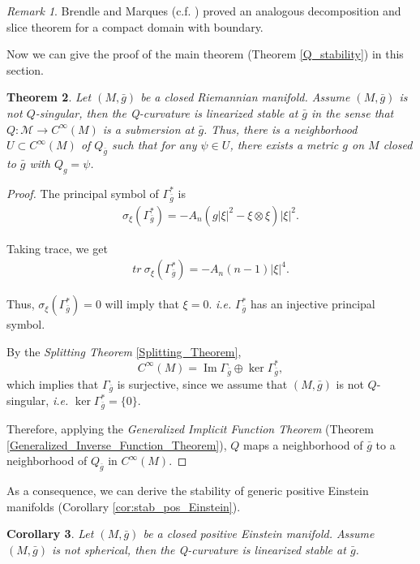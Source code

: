 \documentclass[12pt]{amsart}
\newtheorem{theorem}{Theorem}[section]
\newtheorem{corollary}[theorem]{Corollary}
\theoremstyle{definition}
\theoremstyle{remark}
\newtheorem{remark}[theorem]{Remark}
\numberwithin{equation}{section}
\begin{document}
\begin{remark}
Brendle and Marques (c.f. \cite{B-M}) proved an analogous decomposition and slice theorem for a compact domain with boundary.
\end{remark}

Now we can give the proof of the main theorem (Theorem \ref{Q_stability}) in this section.
\begin{theorem}
Let $(M,\bar{g})$ be a closed Riemannian manifold. Assume
$(M,\bar{g})$ is not $Q$-singular, then the Q-curvature is linearized stable at $\bar g$ in the sense that $Q : \mathcal{M} \rightarrow C^{\infty}(M) $ is a submersion at $\bar{g}$.
Thus, there is a neighborhood $U \subset C^{\infty}(M)$ of $Q_{\bar{g}}$ such that for any $\psi \in U$, there exists a metric $g$ on $M$ closed to $\bar{g}$ with $Q_g = \psi$.
\end{theorem}
\begin{proof}

The principal symbol of $\Gamma_{\bar{g}}^*$ is
\begin{align*}
\sigma_{\xi}(\Gamma_{\bar{g}}^*) = - A_n \left( g |\xi|^2 - \xi \otimes\xi \right)|\xi|^2.
\end{align*}

Taking trace, we get
\begin{align*}
tr\ \sigma_{\xi}(\Gamma_{\bar{g}}^*) = - A_n \left( n - 1 \right)|\xi|^4.
\end{align*}

Thus, $\sigma_{\xi}(\Gamma_{\bar{g}}^*) = 0$ will imply that $\xi = 0$. \emph{i.e.} $\Gamma^*_{\bar{g}}$ has an injective principal symbol.

By the \emph{Splitting Theorem} \ref{Splitting_Theorem},
$$C^\infty(M) = \operatorname{Im} \Gamma_{\bar{g}} \oplus \ker \Gamma^*_{\bar{g}},$$
which implies that $\Gamma_{\bar{g}}$ is surjective, since we assume that $(M,\bar{g})$ is not $Q$-singular, \emph{i.e.} $\ker \Gamma^*_{\bar{g}} = \{0\}$.

Therefore, applying the \emph{Generalized Implicit Function Theorem} (Theorem \ref{Generalized_Inverse_Function_Theorem}), $Q$ maps a neighborhood of $\bar g$ to a neighborhood of $Q_{\bar{g}}$ in $C^\infty(M)$.

\end{proof}

As a consequence, we can derive the stability of generic positive Einstein manifolds (Corollary \ref{cor:stab_pos_Einstein}).

\begin{corollary}
Let $(M,\bar{g})$ be a closed positive Einstein manifold. Assume $(M,\bar{g})$ is not spherical, then the Q-curvature is linearized stable at $\bar g$.
\end{corollary}
\end{document}
